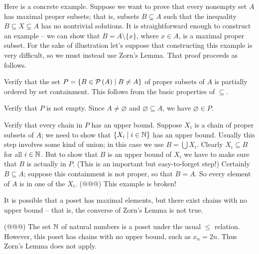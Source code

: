 Here is a concrete example.
Suppose we want to prove that every nonempty set \(A\) has maximal proper subsets; that is, subsets \(B \subsetneq A\) such that the inequality \(B \subseteq X \subsetneq A\) has no nontrivial solutions.
It is straightforward enough to construct an example -- we can show that \(B = A \setminus \{x\}\), where \(x \in A\), is a maximal proper subset.
For the sake of illustration let's suppose that constructing this example is very difficult, so we must instead use Zorn's Lemma.
That proof proceeds as follows.
\begin{proplist}
\item Verify that the set \(P = \{ B \in \mathcal{P}\left(A\right) \mid B \neq A \}\) of proper subsets of \(A\) is partially ordered by set containment.
This follows from the basic properties of \(\subseteq\).
\item Verify that \(P\) is not empty.
Since \(A \neq \varnothing\) and \(\varnothing \subseteq A\), we have \(\varnothing \in P\).
\item Verify that every chain in \(P\) has an upper bound.
Suppose \(X_i\) is a chain of proper subsets of \(A\); we need to show that \(\{ X_i \mid i \in \mathbb{N} \}\) has an upper bound.
Usually this step involves some kind of union; in this case we use \(B = \bigcup X_i\).
Clearly \(X_i \subseteq B\) for all \(i \in \mathbb{N}\).
But to show that \(B\) is an upper bound of \(X_i\) we have to make sure that \(B\) is actually in \(P\).
(This is an important but easy-to-forget step!)
Certainly \(B \subseteq A\); suppose this containment is not proper, so that \(B = A\).
So every element of \(A\) is in one of the \(X_i\).
(@@@) This example is broken!
\end{proplist}

It is possible that a poset has maximal elements, but there exist chains with no upper bound -- that is, the converse of Zorn's Lemma is not true.



\Exercises%

\begin{exercise}
(@@@) The set \(\mathbb{N}\) of natural numbers is a poset under the usual \(\leq\) relation.
However, this poset has chains with no upper bound, such as \(x_n = 2n\).
Thus Zorn's Lemma does not apply.
\end{exercise}
